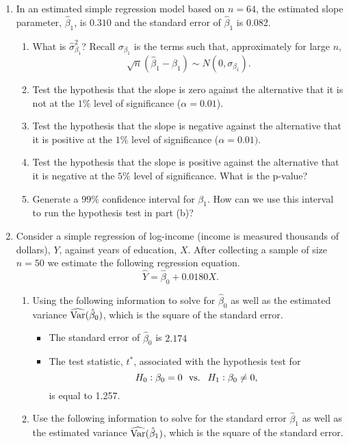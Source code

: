 \documentclass[10pt]{article}
\begin{document}
\begin{enumerate}
	\item In an estimated simple regression model based on \(n = 64\), the estimated slope parameter, \(\hat\beta_1\), is  \(0.310\) and the standard error of \(\hat\beta_1\) is 0.082.
	\begin{enumerate}
		\item What is \(\hat\sigma_{\beta_1}^2\)? Recall \(\sigma_{\beta_1}\) is the terms such that, approximately for large  \(n\),
		\[
			\sqrt{n}(\hat\beta_1 - \beta_1)\sim N(0,\sigma_{\beta_1})
		.\] 
		\item Test the hypothesis that the slope is zero against the alternative that it is not at the \(1\%\) level of significance (\(\alpha = 0.01\)).	
		\item Test the hypothesis that the slope is negative against the alternative that it is positive at the \(1\%\) level of significance (\(\alpha = 0.01)\). 
		\item Test the hypothesis that the slope is positive against the alternative that it is negative at the \(5\%\) level of significance. What is the p-value?
		\item Generate a \(99\%\) confidence interval for  \(\beta_1\). How can we use this interval to run the hypothesis test in part (b)?
	\end{enumerate}
	\item Consider a simple regression of log-income (income is measured thousands of dollars), \(Y\), against years of education,  \(X\). After collecting a sample of size \(n=50\) we estimate the following regression equation. 
	 \[
		 \widehat Y = \hat\beta_0 + 0.0180 X
	.\]
	\begin{enumerate}
		\item Using the following information to solve for \(\hat\beta_0\) as well as the estimated variance \(\widehat{\operatorname{Var}}(\hat\beta_0)\), which is the square of the standard error. 
		\begin{itemize}
			\item The standard error of \(\hat\beta_0\) is  \(2.174\)
			\item The test statistic, \(t^*\), associated with the hypothesis test for
			 \[
				 H_0:\beta_0 = 0\hbox{ }\text{ vs. }\hbox{ }H_1:\beta_0 \neq 0
			,\]
			is equal to 1.257. 
		\end{itemize}
		\item Use the following information to solve for the standard error \(\hat\beta_1\) as well as the estimated variance \(\widehat{\operatorname{Var}}(\hat\beta_1)\), which is the square of the standard error.

\end{enumerate}
\end{enumerate}
\end{document}
